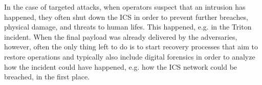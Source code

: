 \documentclass[runningheads]{llncs}
\begin{document}
In the case of targeted attacks, when operators suspect that an intrusion has happened, they often shut down the ICS in order to prevent further breaches, physical damage, and threats to human lifes.
This happened, e.g. in the Triton incident.
When the final payload was already delivered by the adversaries, however, often the only thing left to do is to start recovery processes that aim to restore operations and typically also include digital forensics in order to analyze how the incident could have happened, e.g. how the ICS network could be breached, in the first place.
\end{document}

